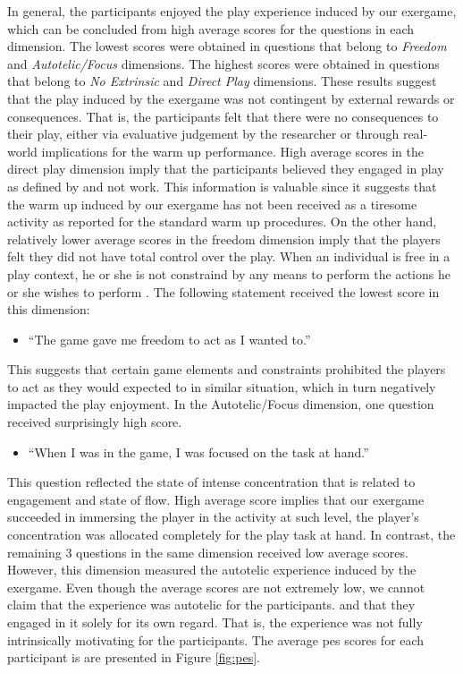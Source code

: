 In general, the participants enjoyed the play experience induced by our exergame, which can be concluded from high average scores for the questions in each dimension. The lowest scores were obtained in questions that belong to \textit{Freedom} and \textit{Autotelic/Focus} dimensions. The highest scores were obtained in questions that belong to \textit{No Extrinsic} and \textit{Direct Play} dimensions. These results suggest that the play induced by the exergame was not contingent by external rewards or consequences. That is, the participants felt that there were no consequences to their play, either via evaluative judgement by the researcher or through real-world implications for the warm up performance. High average scores in the direct play dimension imply that the participants believed they engaged in play as defined by \cite{pavlas2012play} and not work. This information is valuable since it suggests that the warm up induced by our exergame has not been received as a tiresome activity as reported for the standard warm up procedures. On the other hand, relatively lower average scores in the freedom dimension imply that the players felt they did not have total control over the play. When an individual is free in a play context, he or she is not constraind by any means to perform the actions he or she wishes to perform \cite{pavlas2012play}. The following statement received the lowest score in this dimension: 
\begin{itemize}
\item ``The game gave me freedom to act as I wanted to.''
\end{itemize} This suggests that certain game elements and constraints prohibited the players to act as they would expected to in similar situation, which in turn negatively impacted the play enjoyment.  In the Autotelic/Focus dimension, one question received surprisingly high score.  
\begin{itemize}
\item ``When I was in the game, I was focused on the task at hand.''
\end{itemize} This question reflected the state of intense concentration that is related to engagement and state of flow. High average score implies that our exergame succeeded in immersing the player in the activity at such  level, the player's concentration was allocated completely for the play task at hand.  In contrast, the remaining 3 questions in the same dimension received low average scores. However, this dimension measured the autotelic experience induced by the exergame.  Even though the average scores are not extremely low, we cannot claim that the experience was autotelic for the participants. and that they engaged in it solely for its own regard. That is, the experience was not fully intrinsically motivating for the participants. The average \gls{pes} scores for each participant is are presented in Figure \ref{fig:pes}.
